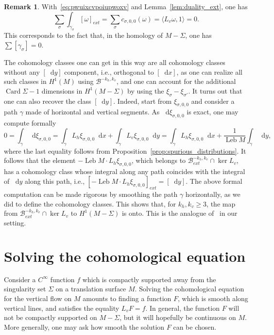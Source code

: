 \documentclass[11pt, a4paper, oneside, final, pagebackref]{amsart}
\newcommand{\boB}{\mathcal{B}}
\newcommand{\dd}{\mathop{}\!\mathrm{d}}
\DeclareMathOperator{\Card}{Card}
\DeclareMathOperator{\Leb}{Leb}
\renewcommand{\geq}{\geqslant}
\theoremstyle{definition}
\newtheorem{rmk}[thm]{Remark}
\numberwithin{equation}{section}
\begin{document}
\begin{rmk}
With~\eqref{eq:pwuixcvpoiupwoxv} and Lemma~\ref{lem:duality_ext}, one has
\begin{equation*}
  \sum_{\sigma} \int_{\gamma_\sigma} [\omega]_{ext}
  = \sum_{\sigma} c_{\sigma, 0, 0}(\omega) =
  \langle L_v \omega, 1 \rangle
  = 0.
\end{equation*}
This corresponds to the fact that, in the homology of $M-\Sigma$, one has
$\sum [\gamma_\sigma] = 0$.

The cohomology classes one can get in this way are all cohomology classes
without any $[\dd y]$ component, i.e., orthogonal to $[\dd x]$, as one can
realize all such classes in $H^1(M)$ using $\boB^{-k_h, k_v}$, and one can
account for the additional $\Card \Sigma - 1$ dimensions in $H^1(M-\Sigma)$
by using the $\xi_\sigma - \xi_{\sigma'}$. It turns out that one can also
recover the class $[\dd y]$. Indeed, start from $\xi_{\sigma, 0, 0}$ and
consider a path $\gamma$ made of horizontal and vertical segments. As $\dd
\xi_{\sigma,0, 0}$ is exact, one may compute formally
\begin{equation*}
  0 = \int_\gamma \dd \xi_{\sigma,0, 0}
  = \int_\gamma L_h \xi_{\sigma, 0,0} \dd x + \int_{\gamma} L_v \xi_{\sigma, 0, 0} \dd y
  = \int_\gamma L_h \xi_{\sigma, 0,0} \dd x + \frac{1}{\Leb M} \int_{\gamma} \dd y,
\end{equation*}
where the last equality follows from
Proposition~\ref{prop:spurious_distributions}. It follows that the element
$-\Leb M \cdot L_h \xi_{\sigma, 0,0}$, which belongs to $\boB^{-k_h,
k_v}_{ext} \cap \ker L_v$, has a cohomology class whose integral along any
path coincides with the integral of $\dd y$ along this path, i.e., $[-\Leb M
\cdot L_h \xi_{\sigma, 0,0}]_{ext} = [\dd y]$. The above formal computation
can be made rigorous by smoothing the path $\gamma$ horizontally, as we did
to define the cohomology classes. This shows that, for $k_h, k_v \geq 3$, the
map from $\boB^{-k_h, k_v}_{ext} \cap \ker L_v$ to $H^1(M-\Sigma)$ is onto.
This is the analogue of~\cite[Theorem~7.1(ii)]{forni_deviation} in our
setting.
\end{rmk}

\section{Solving the cohomological equation}
\label{sec:cohomological}

Consider a $C^\infty$ function $f$ which is compactly supported away from the
singularity set $\Sigma$ on a translation surface $M$. Solving the
cohomological equation for the vertical flow on $M$ amounts to finding a
function $F$, which is smooth along vertical lines, and satisfies the
equality $L_v F = f$. In general, the function $F$ will not be compactly
supported on $M-\Sigma$, but it will hopefully be continuous on $M$. More
generally, one may ask how smooth the solution $F$ can be chosen.
\end{document}
